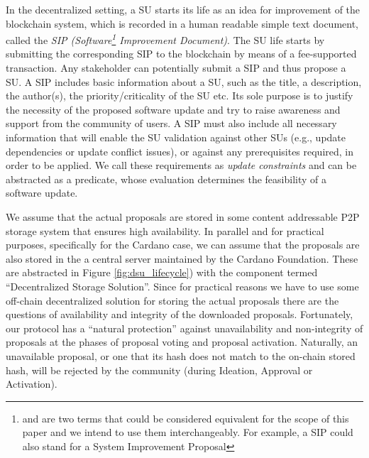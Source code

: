 In the decentralized setting, a SU starts its life as an idea for improvement of the blockchain system, which is recorded in a human readable simple text document, called the \emph{SIP (Software\footnote{ and  are two terms that could be considered equivalent for the scope of this paper and we intend to use them interchangeably. For example, a SIP could also stand for a System Improvement Proposal} Improvement Document)}. The SU life starts by submitting the corresponding SIP to the blockchain by means of a fee-supported
 transaction. Any stakeholder can potentially submit a SIP and thus propose a SU. 
A SIP includes basic information about a SU, such as the title, a description, 
the author(s), the priority/criticality of the SU etc. Its sole purpose is to 
justify the necessity of the proposed software update and try to raise 
awareness and support from the community of users. A SIP must also include all 
necessary information that will enable the SU validation against other SUs 
(e.g., update dependencies or update conflict issues), or against any 
prerequisites required, in order to be applied. We call these requirements as 
\emph{update constraints} and can be abstracted as a predicate, whose 
evaluation determines the feasibility of a software update.  

We assume that the actual proposals are stored in some content addressable P2P 
storage system that ensures
high availability. In parallel and for practical purposes, specifically for the 
Cardano case, we can assume that
the proposals are also stored in the a central server maintained by the Cardano 
Foundation. These are abstracted
in Figure 
\ref{fig:dsu_lifecycle}) with the component termed ``Decentralized Storage 
Solution''. Since for practical reasons we have
to use some off-chain decentralized solution for storing the actual proposals 
there are the questions of availability and integrity of the downloaded 
proposals. Fortunately, our protocol has a ``natural protection'' against
unavailability and non-integrity of proposals at the phases of proposal voting 
and proposal activation. Naturally, an unavailable proposal, or one that its 
hash does not match to the on-chain stored hash, will be rejected by the 
community (during Ideation, Approval or Activation).

